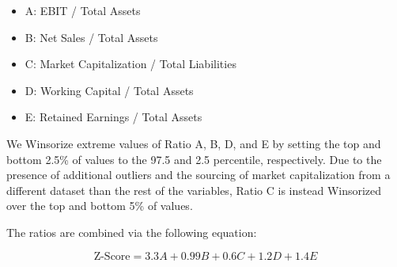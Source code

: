 \documentclass{article}[11pt]
\begin{document}
    \begin{itemize}
        \item A: EBIT / Total Assets
        \item B: Net Sales / Total Assets
        \item C: Market Capitalization / Total Liabilities
        \item D: Working Capital / Total Assets
        \item E: Retained Earnings / Total Assets
    \end{itemize}

    We Winsorize extreme values of Ratio A, B, D, and E by setting the top and bottom 2.5\% of values to the 97.5 and 2.5 percentile, respectively. Due to the presence of additional outliers and the sourcing of market capitalization from a different dataset than the rest of the variables, Ratio C is instead Winsorized over the top and bottom 5\% of values. 

    The ratios are combined via the following equation:

    \begin{equation*}
        \text{Z-Score} = 3.3 A + 0.99 B + 0.6 C + 1.2 D + 1.4 E
    \end{equation*}
\end{document}
